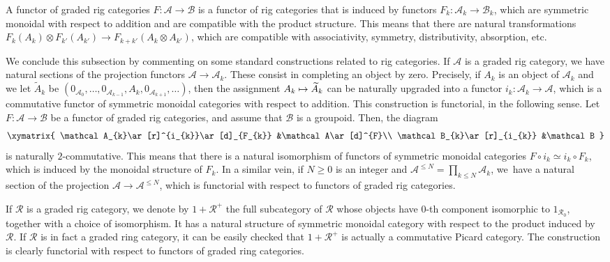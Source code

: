 \documentclass[11pt]{article}
\newcommand\mto{\mathchoice{\longmapsto}{\mapsto}{\mapsto}{\mapsto}}
\theoremstyle{plain}
\theoremstyle{definition}
\newcommand{\Acal}{\mathcal A}
\newcommand{\Bcal}{\mathcal B}
\newcommand{\Rcal}{\mathcal R}
\begin{document}
A functor of graded rig categories $F\colon\Acal\to\Bcal$ is a functor of rig categories that is induced by functors $F_{k}\colon \Acal_{k}\to\Bcal_{k}$, which are symmetric monoidal with respect to addition and are compatible with the product structure. This means that there are natural transformations $F_{k}(A_{k})\otimes F_{k'}(A_{k'})\to F_{k+k'}(A_{k}\otimes A_{k'})$, which are compatible with associativity, symmetry, distributivity, absorption, etc.

We conclude this subsection by commenting on some standard constructions related to rig categories. If $\Acal$ is a graded rig category, we have natural sections of the projection functors $\Acal\to\Acal_{k}$. These consist in completing an object by zero. Precisely, if $A_{k}$ is an object of $\Acal_{k}$ and we let $\widetilde{A}_{k}$ be $(0_{\Acal_{0}},\ldots, 0_{\Acal_{k-1}},A_{k},0_{\Acal_{k+1}},\ldots)$, then the assignment $A_{k}\mto\widetilde{A}_{k}$ can be naturally upgraded into a functor $i_{k}\colon\Acal_{k}\to\Acal$, which is a commutative functor of symmetric monoidal categories with respect to addition. This construction is functorial, in the following sense. Let $F\colon\Acal\to\Bcal$ be a functor of graded rig categories, and assume that $\Bcal$ is a groupoid. Then, the diagram
\begin{displaymath}
\xymatrix{
\Acal_{k}\ar[r]^{i_{k}}\ar[d]_{F_{k}} &\Acal\ar[d]^{F}\\
\Bcal_{k}\ar[r]_{i_{k}} &\Bcal
}
\end{displaymath}
is naturally $2$-commutative. This means that there is a natural isomorphism of functors of symmetric monoidal categories $F\circ i_{k}\simeq i_{k}\circ F_{k}$, which is induced by the monoidal structure of $F_{k}$. In a similar vein, if $N\geq 0$ is an integer and $\Acal^{\leq N}=\prod_{k\leq N}\Acal_{k}$, we~have a natural section of the projection $\Acal\to\Acal^{\leq N}$, which is functorial with respect to functors of graded rig categories.

If $\Rcal$ is a graded rig category, we denote by $1+\Rcal^{+}$ the full subcategory of $\Rcal$ whose objects have $0$-th component isomorphic to $1_{\Rcal_{0}}$, together with a choice of isomorphism. It has a natural structure of symmetric monoidal category with respect to the product induced by $\Rcal$. If $\Rcal$ is in fact a graded ring category, it can be easily checked that $1+\Rcal^{+}$ is actually a commutative Picard category. The construction is clearly functorial with respect to functors of graded ring categories.
\end{document}
